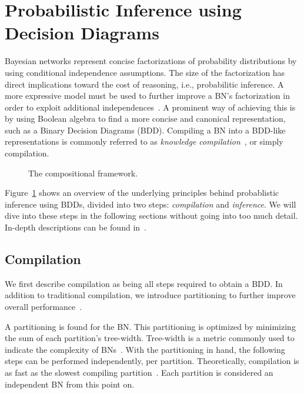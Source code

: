 
\section{Probabilistic Inference using Decision Diagrams}\label{sec:parallel}


Bayesian networks represent concise factorizations of probability distributions by using conditional independence assumptions. The size of the factorization has direct implications toward the cost of reasoning, i.e., probabilitic inference. A more expressive model must be used to further improve a BN's factorization in order to exploit additional independences~\cite{boutilier1996context,friedman1998learning,zhang1996exploiting}. A prominent way of achieving this is by using Boolean algebra to find a more concise and canonical representation, such as a Binary Decision Diagrams (BDD). Compiling a BN into a BDD-like representations is commonly referred to as \emph{knowledge compilation}~\cite{darwiche2002knowledge}, or simply compilation.

\begin{figure}[!t]
    \centering
    \scalebox{0.9}{
        
    }
    \caption{The compositional framework.}
    \label{fig:frameworkoverview}
\end{figure}


Figure~\ref{fig:frameworkoverview} shows an overview of the underlying principles behind probablistic inference using BDDs, divided into two steps: \emph{compilation} and \emph{inference}. We will dive into these steps in the following sections without going into too much detail. In-depth descriptions can be found in~\cite{dal2021compositional}.

\subsection{Compilation}

We first describe compilation as being all steps required to obtain a BDD. In addition to traditional compilation, we introduce partitioning to further improve overall performance~\cite{dal2017reducing}.

A partitioning is found for the BN. This partitioning is optimized by minimizing the sum of each partition's tree-width. Tree-width is a metric commonly used to indicate the complexity of BNs~\cite{bollig2014width}. With the partitioning in hand, the following steps can be performed independently, per partition. Theoretically, compilation is as fast as the slowest compiling partition~\cite{dal2018parallel}. Each partition is considered an independent BN from this point on.

